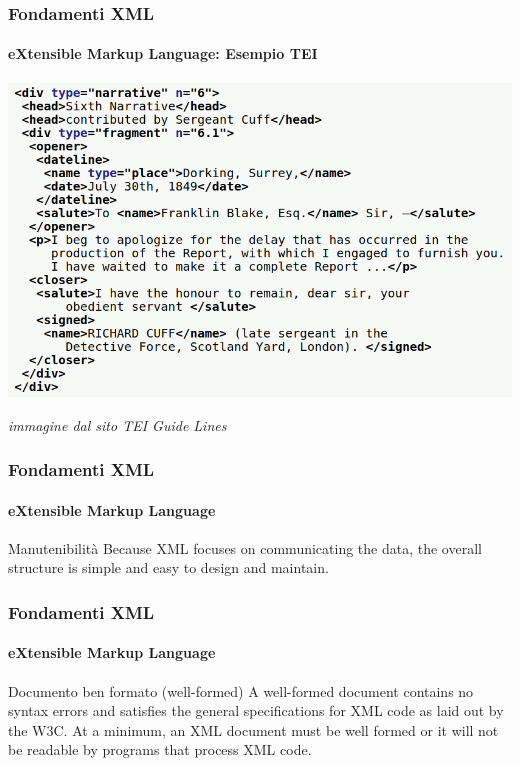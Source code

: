 \begin{frame}
	\frametitle{Fondamenti XML}
	\framesubtitle{eXtensible Markup Language: Esempio TEI}
	\addtocounter{nframe}{1}

	\begin{center}
		\includegraphics[width=.9\textwidth]{imgs/xml-TEI-Example.png}
	\end{center}

	\begin{tiny}
        \textit{immagine dal sito TEI Guide Lines}
    \end{tiny}

\end{frame}

\begin{frame}
	\frametitle{Fondamenti XML}
	\framesubtitle{eXtensible Markup Language}
	\addtocounter{nframe}{1}

	\begin{block}{Manutenibilità}
		Because XML focuses on communicating the data, the overall structure is simple and easy to design and
maintain.
	\end{block}

\end{frame}

\begin{frame}
	\frametitle{Fondamenti XML}
	\framesubtitle{eXtensible Markup Language}
	\addtocounter{nframe}{1}

	\begin{block}{Documento ben formato (well-formed)}
        A well-formed document contains no syntax errors and satisfies the general specifications for XML code as laid
        out by the W3C. At a minimum, an XML document must be well formed or it will not
        be readable by programs that process XML code.
	\end{block}

\end{frame}


